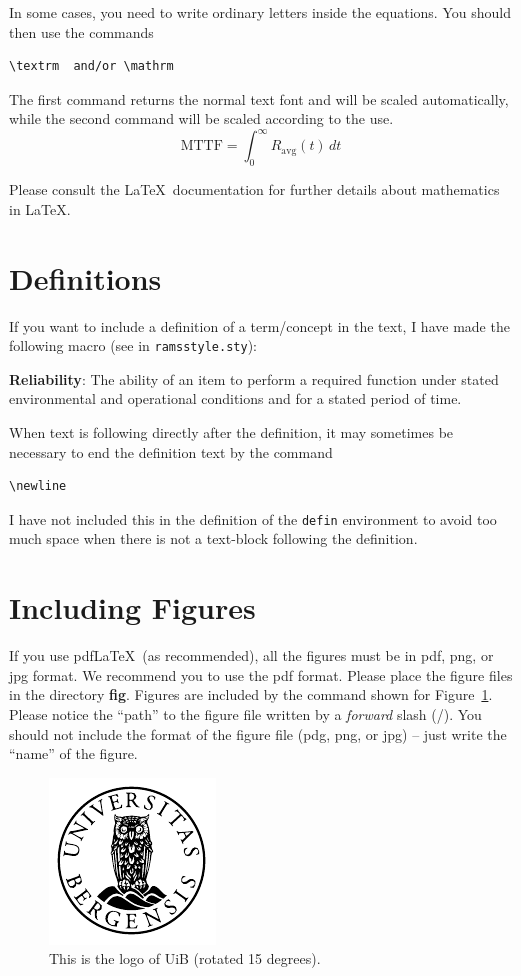 \documentclass[../Main/thesis.tex]{subfiles}
\begin{document}
In some cases, you need to write ordinary letters inside the equations. 
You should then use the commands 
\begin{verbatim}
\textrm  and/or \mathrm
\end{verbatim}
The first command returns the normal text font and will be scaled automatically, while the second command will be scaled according to the use.
\begin{equation*}
\textrm{MTTF}= \int_0^\infty R_\mathrm{avg}(t)\,dt
\end{equation*}



Please consult the \LaTeX\ documentation for further details about mathematics in \LaTeX.
\section*{Definitions}
\label{sec:definitions}
If you want to include a definition of a term/concept in the text, I have made the following macro (see in \texttt{ramsstyle.sty}):
\begin{defin}
\textbf{Reliability}: The ability of an item to perform a required function under stated environmental and operational conditions and for a stated period of time.\newline
\end{defin}
When text is following directly after the definition, it may sometimes be necessary to end the definition text by the command
\begin{verbatim}
\newline
\end{verbatim}
I have not included this in the definition of the \texttt{defin} environment to avoid too much space when there is not a text-block following the definition.
\section{Including Figures}
\label{sec:including_figures}
If you use pdf\LaTeX\ (as recommended), all the figures must be in pdf, png, or jpg format. 
We recommend you to use the pdf format.  
Please place the figure files in the directory \textbf{fig}. 
Figures are included by the command shown for Figure~\ref{fig:uib_logo_rotated}. 
Please notice the ``path'' to the figure file written by a \emph{forward} slash (/). 
You should not include the format of the figure file (pdg, png, or jpg) -- just write the ``name'' of the figure. 
\begin{figure}
\centering
\includegraphics[scale=0.6,angle=15]{../fig/uib}
\caption{This is the logo of UiB (rotated 15 degrees).}
\label{fig:uib_logo_rotated}
\end{figure}
\end{document}
